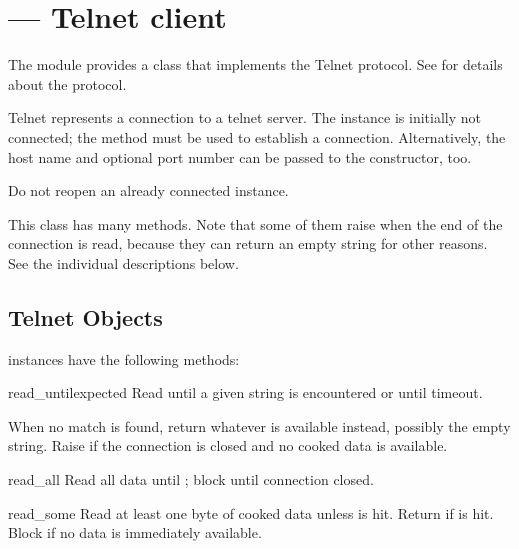 \section{ ---
         Telnet client}




The  module provides a  class that
implements the Telnet protocol.  See  for details about the
protocol.


\begin{classdesc}{Telnet}{}
 represents a connection to a telnet server. The
instance is initially not connected; the  method must
be used to establish a connection.  Alternatively, the host name and
optional port number can be passed to the constructor, too.

Do not reopen an already connected instance.

This class has many  methods.  Note that some of them 
raise  when the end of the connection is read,
because they can return an empty string for other reasons.  See the
individual descriptions below.
\end{classdesc}


\subsection{Telnet Objects \label{telnet-objects}}

 instances have the following methods:


\begin{methoddesc}{read_until}{expected}
Read until a given string is encountered or until timeout.

When no match is found, return whatever is available instead,
possibly the empty string.  Raise  if the connection
is closed and no cooked data is available.
\end{methoddesc}

\begin{methoddesc}{read_all}{}
Read all data until \EOF{}; block until connection closed.
\end{methoddesc}

\begin{methoddesc}{read_some}{}
Read at least one byte of cooked data unless \EOF{} is hit.
Return  if \EOF{} is hit.  Block if no data is immediately
available.
\end{methoddesc}

